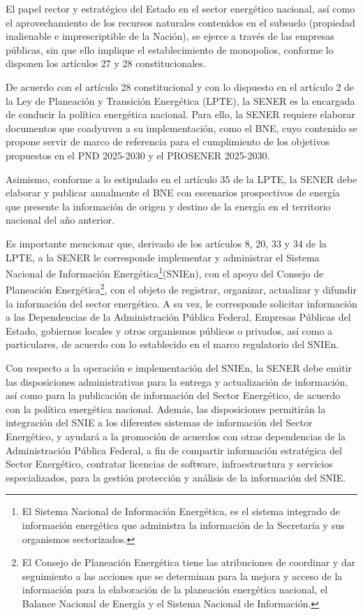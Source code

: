 \documentclass{sener2025}
\begin{document}
El papel rector y estratégico del Estado en el sector energético nacional, así como el aprovechamiento de los recursos naturales contenidos en el subsuelo (propiedad inalienable e imprescriptible de la Nación), se ejerce a través de las empresas públicas, sin que ello implique el establecimiento de monopolios, conforme lo disponen los artículos 27 y 28 constitucionales.

De acuerdo con el artículo 28 constitucional y con lo dispuesto en el artículo 2 de la Ley de Planeación y Transición Energética (LPTE), la SENER es la encargada de conducir la política energética nacional. Para ello, la SENER requiere elaborar documentos que coadyuven a su implementación, como el BNE, cuyo contenido se propone servir de marco de referencia para el cumplimiento de los objetivos propuestos en el PND 2025-2030 y el PROSENER 2025-2030.

Asimismo, conforme a lo estipulado en el artículo 35 de la LPTE, la SENER debe elaborar y publicar anualmente el BNE con escenarios prospectivos de energía que presente la información de origen y destino de la energía en el territorio nacional del año anterior.

Es importante mencionar que, derivado de los artículos 8, 20, 33 y 34 de la LPTE, a la SENER le corresponde implementar y administrar el Sistema Nacional de Información Energética\footnote{El Sistema Nacional de Información Energética, es el sistema integrado de información energética que administra la información de la Secretaría y sus organismos sectorizados.}(SNIEn), con el apoyo del Consejo de Planeación Energética\footnote{El Consejo de Planeación Energética tiene las atribuciones de coordinar y dar seguimiento a las acciones que se determinan para la mejora y acceso de la información para la elaboración de la planeación energética nacional, el Balance Nacional de Energía y el Sistema Nacional de Información.}, con el objeto de registrar, organizar, actualizar y difundir la información del sector energético. A su vez, le corresponde solicitar información a las Dependencias de la Administración Pública Federal, Empresas Públicas del Estado, gobiernos locales y otros organismos públicos o privados, así como a particulares, de acuerdo con lo establecido en el marco regulatorio del SNIEn.

Con respecto a la operación e implementación del SNIEn, la SENER debe emitir las disposiciones administrativas para la entrega y actualización de información, así como para la publicación de información del Sector Energético, de acuerdo con la política energética nacional. Además, las disposiciones permitirán la integración del SNIE a los diferentes sistemas de información del Sector Energético, y ayudará a la promoción de acuerdos con otras dependencias de la Administración Pública Federal, a fin de compartir información estratégica del Sector Energético, contratar licencias de software, infraestructura y servicios especializados, para la gestión protección y análisis de la información del SNIE.
\end{document}
